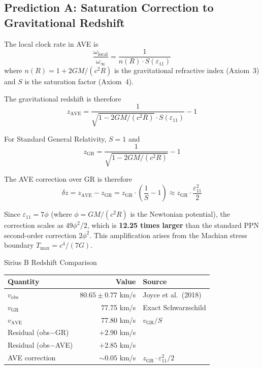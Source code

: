 \subsection{Prediction A: Saturation Correction to Gravitational Redshift}

The local clock rate in AVE is
\begin{equation}
    \frac{\omega_{\text{local}}}{\omega_\infty} = \frac{1}{n(R) \cdot S(\varepsilon_{11})}
\end{equation}
where $n(R) = 1 + 2GM/(c^2 R)$ is the gravitational refractive index (Axiom~3)
and $S$ is the saturation factor (Axiom~4).

The gravitational redshift is therefore
\begin{equation}
    z_{\text{AVE}} = \frac{1}{\sqrt{1 - 2GM/(c^2 R)} \cdot S(\varepsilon_{11})} - 1
\end{equation}

For Standard General Relativity, $S = 1$ and
\begin{equation}
    z_{\text{GR}} = \frac{1}{\sqrt{1 - 2GM/(c^2 R)}} - 1
\end{equation}

The AVE correction over GR is therefore
\begin{equation}
    \delta z = z_{\text{AVE}} - z_{\text{GR}} = z_{\text{GR}} \cdot \left(\frac{1}{S} - 1\right) \approx z_{\text{GR}} \cdot \frac{\varepsilon_{11}^2}{2}
\end{equation}

Since $\varepsilon_{11} = 7\phi$ (where $\phi = GM/(c^2 R)$ is the Newtonian potential),
the correction scales as $49\phi^2/2$, which is \textbf{12.25 times larger} than the
standard PPN second-order correction $2\phi^2$.
This amplification arises from the Machian stress boundary $T_{\max} = c^4/(7G)$.

\begin{resultbox}{Sirius B Redshift Comparison}
\begin{center}
\begin{tabular}{lrl}
\toprule
\textbf{Quantity} & \textbf{Value} & \textbf{Source} \\
\midrule
$v_{\text{obs}}$  & $80.65 \pm 0.77$ km/s & Joyce et al.\ (2018) \\
$v_{\text{GR}}$   & 77.75 km/s           & Exact Schwarzschild \\
$v_{\text{AVE}}$  & 77.80 km/s           & $v_{\text{GR}} / S$ \\
Residual (obs$-$GR)  & $+2.90$ km/s    & \\
Residual (obs$-$AVE) & $+2.85$ km/s    & \\
AVE correction       & $\sim 0.05$ km/s & $z_{\text{GR}} \cdot \varepsilon_{11}^2/2$ \\
\bottomrule
\end{tabular}
\end{center}
\end{resultbox}

